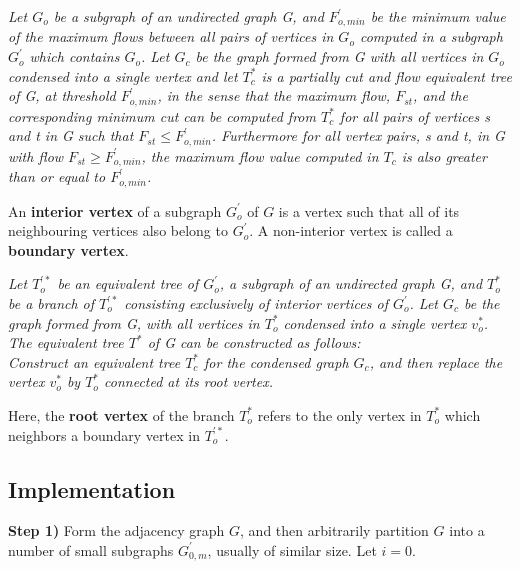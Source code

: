             \vspace{5mm}
             \textit {
                Let $G_o$ be a subgraph of an undirected graph G, and $F^{'}_{o,min}$ be the minimum value of the maximum flows between all pairs of vertices in $G_o$ computed in a subgraph $G^{'}_o$ which contains $G_o$. Let $G_c$ be the graph formed from G with all vertices in $G_o$ condensed into a single vertex and let $T^*_c$ is a partially cut and flow equivalent tree of G, at threshold $F^{'}_{o,min}$, in the sense that the maximum flow, $F_{st}$, and the corresponding minimum cut can be computed from $T^*_c$ for all pairs of vertices s and t in G such that $F_{st} \leq F^{'}_{o,min}$. Furthermore for all vertex pairs, s and t, in G with flow $F_{st} \geq F^{'}_{o,min}$, the maximum flow value computed in $T_c$ is also greater than or equal to $F^{'}_{o,min}$. 
            }

            \vspace{2mm}
            \noindent An \textbf{interior vertex} of a subgraph $G^{'}_o$ of $G$ is a vertex such that all of its neighbouring vertices also belong to $G^{'}_o$. A non-interior vertex is called a \textbf{boundary vertex}.

            \vspace{5mm}
             \textit {
                Let $T^{'*}_o$ be an equivalent tree of $G^{'}_o$, a subgraph of an undirected graph G, and $T^*_o$ be a branch of $T^{'*}_o$ consisting exclusively of interior vertices of $G^{'}_o$. Let $G_c$ be the graph formed from G, with all vertices in $T^*_o$ condensed into a single vertex $v^*_o$. The equivalent tree $T^*$ of G can be constructed as follows: \\
                Construct an equivalent tree $T^*_c$ for the condensed graph $G_c$, and then replace the vertex $v^*_o$ by $T^*_o$ connected at its root vertex.
            }

            \vspace{2mm}
            \noindent Here, the \textbf{root vertex} of the branch $T^*_o$ refers to the only vertex in $T^*_o$ which neighbors a boundary vertex in $T^{'*}_o$.


        \subsection{Implementation}

            \vspace{3mm}
            \noindent \textbf{Step 1)} Form the adjacency graph $G$, and then arbitrarily partition $G$ into a number of small subgraphs {$G^{'}_{0,m}$}, usually of similar size. Let $i=0$.
            
